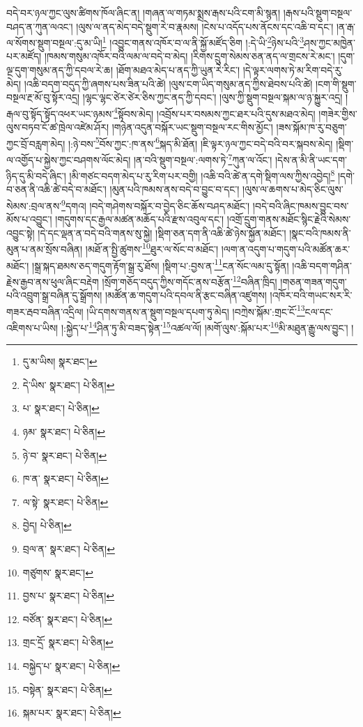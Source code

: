 བདེ་བར་ཉལ་ཀྱང་ལུས་ཚིགས་ཁོལ་ཞིང་ན། །གཞན་ལ་གཏམ་སྨྲས་རྒས་པའི་ངག་མི་སྙན། །རྒས་པའི་སྡུག་བསྔལ་བཤད་ན་ཀུན་ལའང་། །ལུས་ལ་ནད་མེད་བདེ་སྡུག་རེ་བ་རྣམས། །ངེས་པ་འདོད་པས་ནོངས་དང་འཆི་བ་དང་། །ན་རྒ་ལ་སོགས་སྡུག་བསྔལ་:དུ་མ་ཡི།\footnote{དུ་མ་ཡིས།  སྣར་ཐང་། } །འབྱུང་གནས་འཁོར་བ་ལ་ནི་སྐྱོ་མཛོད་ཅིག །:དེ་ཡི་\footnote{དེ་ཡིས་  སྣར་ཐང་།  པེ་ཅིན། }ཉེས་པའི་\footnote{པ་  སྣར་ཐང་།  པེ་ཅིན། }ཤས་ཀྱང་མཁྱེན་པར་མཛོད། །ཁམས་གསུམ་འཁོར་བའི་ལམ་ལ་བདེ་བ་མེད། །རིགས་དྲུག་སེམས་ཅན་ནད་ལ་གྲངས་རེ་མང་། །དུག་ལྔ་དུག་གསུམ་ནད་ཀྱི་དབལ་རེ་ཆ། །ཐོག་མཐའ་མེད་པ་ནད་ཀྱི་ཡུན་རེ་རིང་། །དེ་ལྟར་ལགས་ཏེ་མ་རིག་བདེ་རུ་མེད། །འཆི་བདག་བདུད་ཀྱི་ཞགས་པས་ཟིན་པའི་ཚེ། །ལུས་ངག་ཡིད་གསུམ་ནད་ཀྱིས་ཐེབས་པའི་ཚེ། །ངག་གི་སྡུག་བསྔལ་རྔ་མོ་བུ་སྟོར་འདྲ། །ལྷང་ལྷང་ཙེར་ཙེར་ཅིས་ཀྱང་ནད་ཀྱི་དབང་། །ལུས་ཀྱི་སྡུག་བསྔལ་སྐམ་ལ་ཉ་སྐྱུར་འདྲ། །རྒལ་བུ་སྟོད་སྟོད་འཕར་ཡང་ཉམས་\footnote{ཉམ་  སྣར་ཐང་།  པེ་ཅིན། }སྟོབས་མེད། །འབྲོས་པར་བསམས་ཀྱང་ཐར་པའི་དུས་མཐའ་མེད། །གཟེར་གྱིས་ལུས་བཏབ་ངོ་ཚ་ཁྲེལ་འཛེམ་ཤོར། །གཉེན་འདུན་བསྐོར་ཡང་སྡུག་བསྔལ་རང་གིས་མྱོང་། །ཟས་སྐོམ་ཁ་རུ་བཅུག་ཀྱང་བྲོ་བརླག་མེད། །:ཉེ་བས་\footnote{ཉེ་བ་  སྣར་ཐང་།  པེ་ཅིན། }བོས་ཀྱང་:ཁ་ནས་\footnote{ཁ་ན་  སྣར་ཐང་།  པེ་ཅིན། }སྐད་མི་ཐོན། །ཇི་ལྟར་ཉལ་ཀྱང་བདེ་བའི་བར་སྐབས་མེད། །སྡིག་ལ་འགྱོད་པ་སྐྱེས་ཀྱང་བཤགས་ལོང་མེད། །ན་བའི་སྡུག་བསྔལ་:ལགས་ཏེ་\footnote{ལ་སྟེ་  སྣར་ཐང་།  པེ་ཅིན། }ཀུན་ལ་འོང་། །དེས་ན་མི་ནི་ཡང་དག་ཉིད་དུ་མི་བདེ་ཞིང་། །མི་གཙང་བདག་མེད་པ་རུ་རིག་པར་བགྱི། །འཆི་བའི་ཚེ་ན་དགེ་སྡིག་ལས་ཀྱིས་འབྱེད།\footnote{བྱེད།  པེ་ཅིན། } །དགེ་བ་ཅན་ནི་འཆི་ཚེ་བདེ་བ་མཐོང་། །མུན་པའི་ཁམས་ནས་བདེ་བ་བྱུང་བ་དང་། །ལུས་ལ་ཆགས་པ་མེད་ཅིང་ལུས་སེམས་:བྲལ་ནས་\footnote{བྲལ་ན་  སྣར་ཐང་།  པེ་ཅིན། }དགའ། །བདེ་གཤེགས་བསྐོར་བ་བྱེད་ཅིང་ཆོས་བཤད་མཐོང་། །བདེ་བའི་ཞིང་ཁམས་བྱུང་བས་མོས་པ་འབྱུང་། །གདུགས་དང་རྒྱལ་མཚན་མཆོད་པའི་རྫས་འབུལ་དང་། །འགྲོ་དྲུག་གནས་མཐོང་སྙིང་རྗེའི་སེམས་འབྱུང་སྟེ། །དེ་དང་ལྡན་ན་བདེ་བའི་གནས་སུ་སྐྱེ། །སྡིག་ཅན་དག་ནི་འཆི་ཚེ་ཉེས་སྐྱོན་མཐོང་། །སྣང་བའི་ཁམས་ནི་མུན་པ་ནམ་སྲོས་བཞིན། །མཐོ་ན་སྤྱི་ཚུགས་\footnote{གཙུགས་  སྣར་ཐང་། }ཐུར་ལ་སོང་བ་མཐོང་། །ལག་ན་འདུག་པ་གདུག་པའི་མཚོན་ཆར་མཐོང་། །སྒྲ་སྐད་ཐམས་ཅད་གདུག་རྟོག་སྒྲ་རུ་ཐོས། །སྡིག་པ་:བྱས་ན་\footnote{བྱས་པ་  སྣར་ཐང་།  པེ་ཅིན། }ངན་སོང་ལམ་དུ་སྟོན། །འཆི་བདག་གཤིན་རྗེས་རྒྱབ་ནས་ཕུལ་ཞིང་བརྡེག །སྲོག་གཅོད་བདུད་ཀྱིས་གདོང་ནས་བརྩོན་\footnote{བཙོན་  སྣར་ཐང་།  པེ་ཅིན། }བཞིན་ཁྲིད། །གཅན་གཟན་གདུག་པའི་འབྲུག་སྒྲ་བཞིན་དུ་སྒྲོགས། །མཚོན་ཆ་གདུག་པའི་དབལ་ནི་རྩང་བཞིན་འཛུགས། །འཁོར་བའི་གཡང་སར་རི་གཟར་རྦབ་བཞིན་འདྲིལ། །ཡི་དགས་གནས་ན་སྡུག་བསྔལ་དཔག་ཏུ་མེད། །བཀྲེས་སྐོམ་:གྲང་ངོ་\footnote{གྲང་དྲོ་  སྣར་ཐང་།  པེ་ཅིན། }ངལ་དང་འཇིགས་པ་ཡིས། །:སྐྱེད་པ་\footnote{བསྐྱེད་པ་  སྣར་ཐང་།  པེ་ཅིན། }ཤིན་ཏུ་མི་བཟད་སྟེན་\footnote{བསྟེན་  སྣར་ཐང་།  པེ་ཅིན། }འཚལ་ལོ། །མགོ་ལུས་:སྐོམ་པར་\footnote{སྐམ་པར་  སྣར་ཐང་།  པེ་ཅིན། }མི་མཐུན་རྒྱུ་ལས་བྱུང་། །
